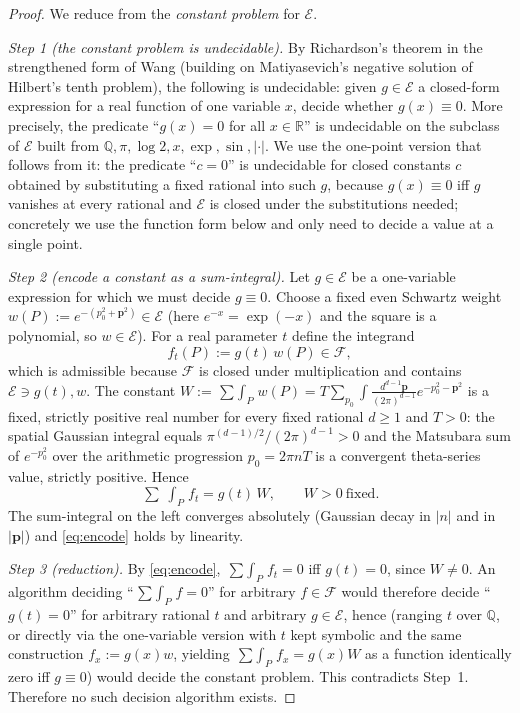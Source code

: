 \documentclass{amsart}
\theoremstyle{definition}
\begin{document}
\begin{proof}
We reduce from the \emph{constant problem} for $\mathcal E$.

\emph{Step 1 (the constant problem is undecidable).}
By Richardson's theorem in the strengthened form of Wang (building on
Matiyasevich's negative solution of Hilbert's tenth problem), the following is
undecidable: given $g\in\mathcal E$ a closed-form expression for a real
function of one variable $x$, decide whether $g(x)\equiv 0$. More precisely,
the predicate ``$g(x)=0$ for all $x\in\mathbb R$'' is undecidable on the
subclass of $\mathcal E$ built from $\mathbb Q,\pi,\log 2,x,\exp,\sin,|\cdot|$.
We use the one-point version that follows from it: the predicate ``$c=0$'' is
undecidable for closed constants $c$ obtained by substituting a fixed rational
into such $g$, because $g(x)\equiv 0$ iff $g$ vanishes at every rational and
$\mathcal E$ is closed under the substitutions needed; concretely we use the
function form below and only need to decide a value at a single point.

\emph{Step 2 (encode a constant as a sum-integral).}
Let $g\in\mathcal E$ be a one-variable expression for which we must decide
$g\equiv 0$. Choose a fixed even Schwartz weight
$w(P):=e^{-(p_0^2+\mathbf p^2)}\in\mathcal E$ (here $e^{-x}=\exp(-x)$ and the
square is a polynomial, so $w\in\mathcal E$). For a real parameter $t$ define
the integrand
\[
  f_t(P) := g(t)\,w(P)\in\mathcal F ,
\]
which is admissible because $\mathcal F$ is closed under multiplication and
contains $\mathcal E\ni g(t),w$. The constant
$W:=\mathop{\sum\!\!\int}_P w(P)=T\sum_{p_0}\int \frac{d^{d-1}\mathbf p}{(2\pi)^{d-1}}
e^{-p_0^2-\mathbf p^2}$
is a fixed, strictly positive real number for every fixed rational $d\geq1$
and $T>0$: the spatial Gaussian integral equals $\pi^{(d-1)/2}/(2\pi)^{d-1}>0$
and the Matsubara sum of $e^{-p_0^2}$ over the arithmetic progression
$p_0=2\pi nT$ is a convergent theta-series value, strictly positive. Hence
\begin{equation}\label{eq:encode}
  \mathop{\textstyle\sum\!\!\!\!\!\!\int}_P f_t
  = g(t)\,W ,\qquad W>0\ \text{fixed}.
\end{equation}
The sum-integral on the left converges absolutely (Gaussian decay in $|n|$ and
in $|\mathbf p|$) and \eqref{eq:encode} holds by linearity.

\emph{Step 3 (reduction).}
By \eqref{eq:encode}, $\mathop{\sum\!\!\int}_P f_t=0$ iff $g(t)=0$, since
$W\neq0$. An algorithm deciding ``$\mathop{\sum\!\!\int}_P f=0$'' for arbitrary
$f\in\mathcal F$ would therefore decide ``$g(t)=0$'' for arbitrary rational
$t$ and arbitrary $g\in\mathcal E$, hence (ranging $t$ over $\mathbb Q$, or
directly via the one-variable version with $t$ kept symbolic and the same
construction $f_x:=g(x)w$, yielding $\mathop{\sum\!\!\int}_P f_x = g(x)W$ as a
function identically zero iff $g\equiv0$) would decide the constant problem.
This contradicts Step~1. Therefore no such decision algorithm exists.


\end{proof}
\end{document}
